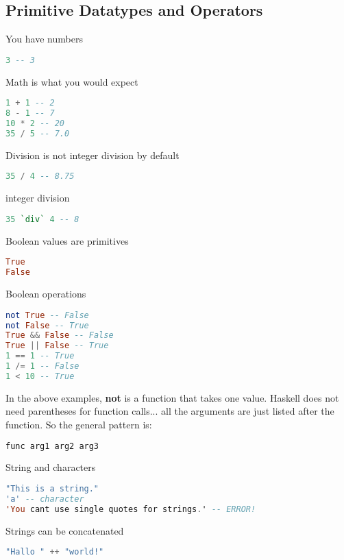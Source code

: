 
\subsection{Primitive Datatypes and Operators}

You have numbers
\begin{lstlisting}[language=Haskell]
3 -- 3
\end{lstlisting}

Math is what you would expect
\begin{lstlisting}[language=Haskell]
1 + 1 -- 2
8 - 1 -- 7
10 * 2 -- 20
35 / 5 -- 7.0
\end{lstlisting}

Division is not integer division by default
\begin{lstlisting}[language=Haskell]
35 / 4 -- 8.75
\end{lstlisting}

integer division
\begin{lstlisting}[language=Haskell]
35 `div` 4 -- 8
\end{lstlisting}

Boolean values are primitives
\begin{lstlisting}[language=Haskell]
True
False
\end{lstlisting}

Boolean operations
\begin{lstlisting}[language=Haskell]
not True -- False
not False -- True
True && False -- False
True || False -- True
1 == 1 -- True
1 /= 1 -- False
1 < 10 -- True
\end{lstlisting}

In the above examples, \textbf{not} is a function that takes one value.
Haskell does not need parentheses for function calls... all the arguments are just
listed after the function. So the general pattern is:

\begin{lstlisting}[language=Haskell]
func arg1 arg2 arg3
\end{lstlisting}

String and characters
\begin{lstlisting}[language=Haskell]
"This is a string."
'a' -- character
'You cant use single quotes for strings.' -- ERROR!
\end{lstlisting}

Strings can be concatenated
\begin{lstlisting}[language=Haskell]
"Hallo " ++ "world!"
\end{lstlisting}

